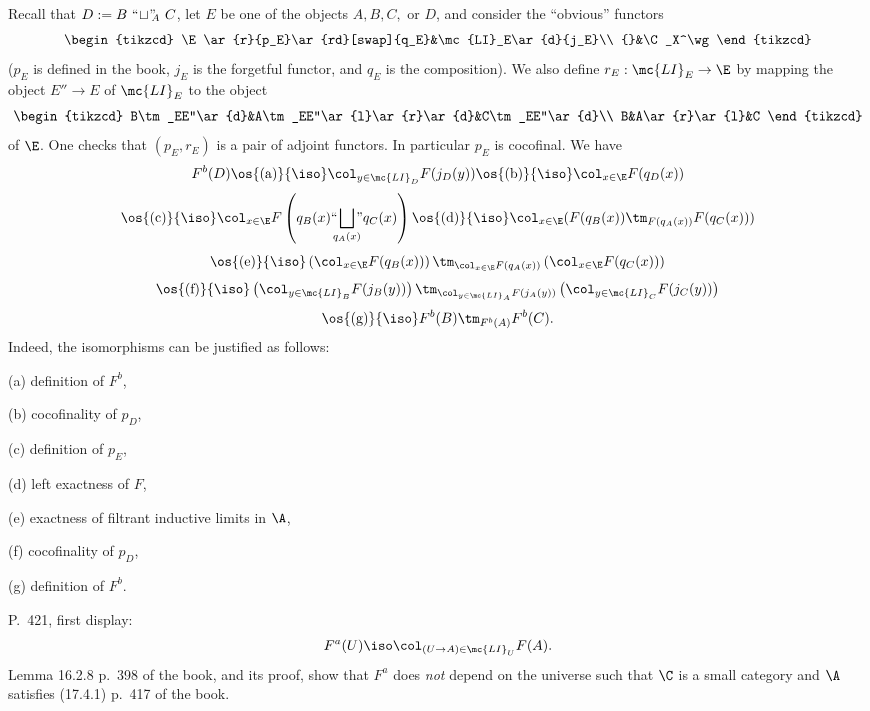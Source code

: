 \documentclass[12pt]{article}
\theoremstyle{remark}
\theoremstyle{definition}
\begin{document}
Recall that $D:=B\ ``\!\sqcup\!"\!\!_A\ C$, let $E$ be one of the objects $A,B,C,$ or $D$, and consider the ``obvious'' functors 
$$
\begin{tikzcd}
\E\ar{r}{p_E}\ar{rd}[swap]{q_E}&\mc{LI}_E\ar{d}{j_E}\\ 
{}&\C_X^\wg
\end{tikzcd}
$$ 
($p_E$ is defined in the book, $j_E$ is the forgetful functor, and $q_E$ is the composition). We also define $r_E:\mc{LI}_E\to\E$ by mapping the object $E''\to E$ of $\mc{LI}_E$ to the object 
$$
\begin{tikzcd}
B\tm_EE''\ar{d}&A\tm_EE''\ar{l}\ar{r}\ar{d}&C\tm_EE''\ar{d}\\ 
B&A\ar{r}\ar{l}&C
\end{tikzcd}
$$ 
of $\E$. One checks that $(p_E,r_E)$ is a pair of adjoint functors. In particular $p_E$ is cocofinal. We have
$$
F^b(D)
\os{(\text a)}{\iso}\col_{y\in\mc{LI}_D}F(j_D(y))
\os{(\text b)}{\iso}\col_{x\in\E}F(q_D(x))
$$
$$
\os{(\text c)}{\iso}\col_{x\in\E}F\left(q_B(x)``\!\!\!\bigsqcup_{q_A(x)}\!\!\!"q_C(x)\right)
\os{(\text d)}{\iso}\col_{x\in\E}(F(q_B(x))\tm_{F(q_A(x))}F(q_C(x)))
$$
$$
\os{(\text e)}{\iso}\left(\col_{x\in\E}F(q_B(x))\right)\tm_{\col_{x\in\E}F(q_A(x))}\left(\col_{x\in\E}F(q_C(x))\right)
$$ 
$$
\os{(\text f)}{\iso}\left(\col_{y\in\mc{LI}_B}F(j_B(y))\right)\tm_{\col_{y\in\mc{LI}_A}F(j_A(y))}\left(\col_{y\in\mc{LI}_C}F(j_C(y))\right)
$$ 
$$
\os{(\text g)}{\iso}F^b(B)\tm_{F^b(A)}F^b(C).
$$ 
Indeed, the isomorphisms can be justified as follows: 

\nn(a) definition of $F^b$, 

\nn(b) cocofinality of $p_D$,

\nn(c) definition of $p_E$, 

\nn(d) left exactness of $F$, 

\nn(e) exactness of filtrant inductive limits in $\A$, 

\nn(f) cocofinality of $p_D$, 

\nn(g) definition of $F^b$. 



\begin{s}
P.~421, first display: 
$$
F^a(U)\iso\col_{(U\to A)\in\mc{LI}_U}F(A).
$$ 
Lemma 16.2.8 p.~398 of the book, and its proof, show that $F^a$ does {\em not} depend on the universe such that $\C$ is a small category and $\A$ satisfies (17.4.1) p.~417 of the book.
\end{s}
\end{document}
